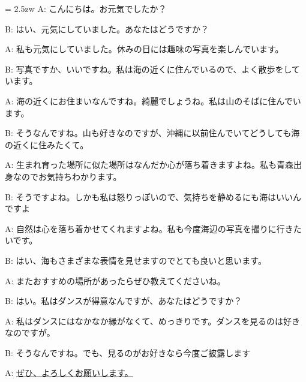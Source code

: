 \documentclass[11pt]{amsart}
\title{}
\author{}
\newenvironment{hangall}[1]{\hangindent = 2.5zw\everypar{\hangindent = 2.5zw}}{}
\begin{document}
\maketitle
\begin{hangall}{}%
A: こんにちは。お元気でしたか？

B: はい、元気にしていました。あなたはどうですか？

A: 私も元気にしていました。休みの日には趣味の写真を楽しんでいます。

B: 写真ですか、いいですね。私は海の近くに住んでいるので、よく散歩をしています。

A: 海の近くにお住まいなんですね。綺麗でしょうね。私は山のそばに住んでいます。

B: そうなんですね。山も好きなのですが、沖縄に以前住んでいてどうしても海の近くに住みたくて。

A: 生まれ育った場所に似た場所はなんだか心が落ち着きますよね。私も青森出身なのでお気持ちわかります。

B: そうですよね。しかも私は怒りっぽいので、気持ちを静めるにも海はいいんですよ

A: 自然は心を落ち着かせてくれますよね。私も今度海辺の写真を撮りに行きたいです。

B: はい、海もさまざまな表情を見せますのでとても良いと思います。

A: またおすすめの場所があったらぜひ教えてくださいね。

B: はい。私はダンスが得意なんですが、あなたはどうですか？

A: 私はダンスにはなかなか縁がなくて、めっきりです。ダンスを見るのは好きなのですが。

B: そうなんですね。でも、見るのがお好きなら今度ご披露します

A: \ul{ぜひ、よろしくお願いします。}\end{hangall}
\end{document}
